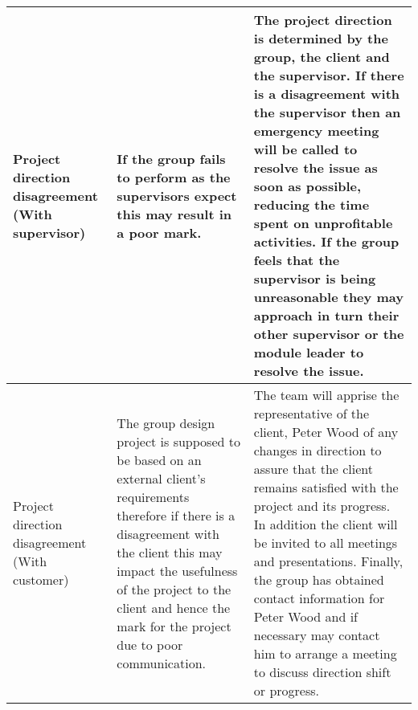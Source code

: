 \begin{center}
\begin{landscape}
\begin{longtable}{>{\raggedright}p{3cm}  >{\raggedright}p{7cm}  p{12cm}}
        Project direction disagreement (With supervisor) & If the group fails to perform as the supervisors expect this may result in a poor mark.                                                                                                                                                                                                                                                                                      & The project direction is determined by the group, the client and the supervisor. If there is a disagreement with the supervisor then an emergency meeting will be called to resolve the issue as soon as possible, reducing the time spent on unprofitable activities. If the group feels that the supervisor is being unreasonable they may approach in turn their other supervisor or the module leader to resolve the issue.                                                                                                                                                                                                                                                                                                                                                                                                                                                                                                                                                                                                          \\ \midrule
        Project direction disagreement (With customer)   & The group design project is supposed to be based on an external client's requirements therefore if there is a disagreement with the client this may impact the usefulness of the project to the client and hence the mark for the project due to poor communication.                                                                                                         & The team will apprise the representative of the client, Peter Wood of any changes in direction to assure that the client remains satisfied with the project and its progress. In addition the client will be invited to all meetings and presentations. Finally, the group has obtained contact information for Peter Wood and if necessary may contact him to arrange a meeting to discuss direction shift or progress.                                                                                                                                                                                                                                                                                                                                                                                                                                                                                                                                                                                                                 \\ \midrule

\end{longtable}
\end{landscape}
\end{center}
